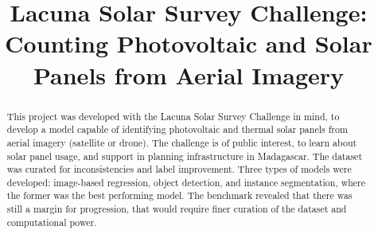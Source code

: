 \documentclass[conference]{IEEEtran}
\begin{document}
\title{Lacuna Solar Survey Challenge: Counting Photovoltaic and Solar Panels from Aerial Imagery}

\author{
\and
{}
}

\maketitle
\thispagestyle{plain}

\begin{abstract}
This project was developed with the Lacuna Solar Survey Challenge in mind, to develop a model capable of identifying photovoltaic and thermal solar panels from aerial imagery (satellite or drone). The challenge is of public interest, to learn about solar panel usage, and support in planning infrastructure in Madagascar. The dataset was curated for inconsistencies and label improvement. Three types of models were developed: image-based regression, object detection, and instance segmentation, where the former was the best performing model. The benchmark revealed that there was still a margin for progression, that would require finer curation of the dataset and computational power.
\end{abstract}
\end{document}
